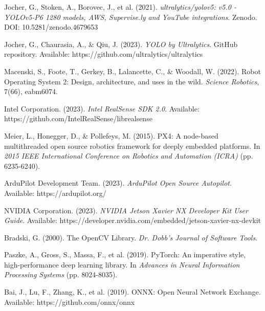 \documentclass[12pt,a4paper]{article}
\begin{document}
\begin{thebibliography}{99}

Jocher, G., Stoken, A., Borovec, J., et al. (2021). \textit{ultralytics/yolov5: v5.0 - YOLOv5-P6 1280 models, AWS, Supervise.ly and YouTube integrations}. Zenodo. DOI: 10.5281/zenodo.4679653

Jocher, G., Chaurasia, A., \& Qiu, J. (2023). \textit{YOLO by Ultralytics}. GitHub repository. Available: https://github.com/ultralytics/ultralytics

Macenski, S., Foote, T., Gerkey, B., Lalancette, C., \& Woodall, W. (2022). Robot Operating System 2: Design, architecture, and uses in the wild. \textit{Science Robotics}, 7(66), eabm6074.

Intel Corporation. (2023). \textit{Intel RealSense SDK 2.0}. Available: https://github.com/IntelRealSense/librealsense

Meier, L., Honegger, D., \& Pollefeys, M. (2015). PX4: A node-based multithreaded open source robotics framework for deeply embedded platforms. In \textit{2015 IEEE International Conference on Robotics and Automation (ICRA)} (pp. 6235-6240).

ArduPilot Development Team. (2023). \textit{ArduPilot Open Source Autopilot}. Available: https://ardupilot.org/

NVIDIA Corporation. (2023). \textit{NVIDIA Jetson Xavier NX Developer Kit User Guide}. Available: https://developer.nvidia.com/embedded/jetson-xavier-nx-devkit

Bradski, G. (2000). The OpenCV Library. \textit{Dr. Dobb's Journal of Software Tools}.

Paszke, A., Gross, S., Massa, F., et al. (2019). PyTorch: An imperative style, high-performance deep learning library. In \textit{Advances in Neural Information Processing Systems} (pp. 8024-8035).

Bai, J., Lu, F., Zhang, K., et al. (2019). ONNX: Open Neural Network Exchange. Available: https://github.com/onnx/onnx

\end{thebibliography}
\end{document}
